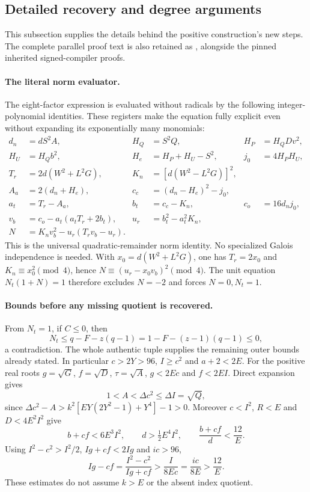 \subsection{Detailed recovery and degree arguments}
This subsection supplies the details behind the positive construction's
new steps. The complete parallel proof text is also retained as
, alongside the pinned inherited
signed-compiler proofs.

\paragraph{The literal norm evaluator.}
The eight-factor expression is evaluated without radicals by the following
integer-polynomial identities. These registers make the equation fully
explicit even without expanding its exponentially many monomials:
\begin{align*}
 d_n&=dS^2A,&H_Q&=S^2Q,&H_P&=H_QDv^2,\\
 H_U&=H_Qb^2,&H_e&=H_P+H_U-S^2,&j_0&=4H_PH_U,\\
 T_r&=2d(W^2+L^2G),&K_n&=[d(W^2-L^2G)]^2,&&\\
 A_a&=2(d_n+H_e),&c_c&=(d_n-H_e)^2-j_0,&&\\
 a_t&=T_r-A_a,&b_t&=c_c-K_n,&c_o&=16d_nj_0,\\
 v_b&=c_o-a_t(a_tT_r+2b_t),&u_r&=b_t^2-a_t^2K_n,&&\\
 N&=K_nv_b^2-u_r(T_rv_b-u_r).&&&&
\end{align*}
This is the universal quadratic-remainder norm identity. No specialized
Galois independence is needed. With $x_0=d(W^2+L^2G)$, one has
$T_r=2x_0$ and $K_n\equiv x_0^2\pmod4$, hence
$N\equiv(u_r-x_0v_b)^2\pmod4$. The unit equation
$N_t(1+N)=1$ therefore excludes $N=-2$ and forces $N=0,N_t=1$.

\paragraph{Bounds before any missing quotient is recovered.}
From $N_t=1$, if $C\le0$, then
\[
 N_t\le q-F-z(q-1)=1-F-(z-1)(q-1)\le0,
\]
a contradiction. The whole authentic tuple supplies the remaining outer
bounds already stated. In particular $c>2Y>96$, $I\ge c^2$ and $a+2<2E$.
For the positive real roots $g=\sqrt G$, $f=\sqrt D$, $\tau=\sqrt A$,
$g<2Ec$ and $f<2EI$. Direct expansion gives
\[
 1<A<\Delta c^2\le\Delta I=\sqrt Q,
\]
since $\Delta c^2-A>k^2[EY(2Y^2-1)+Y^4]-1>0$.
Moreover $c<I^2$, $R<E$ and $D<4E^2I^2$ give
\[
 b+cf<6E^3I^2,\qquad d>\tfrac12E^4I^2,\qquad
 \frac{b+cf}{d}<\frac{12}{E}.
\]
Using $I^2-c^2>I^2/2$, $Ig+cf<2Ig$ and $ic>96$,
\[
 Ig-cf=\frac{I^2-c^2}{Ig+cf}>\frac{I}{8Ec}
       =\frac{ic}{8E}>\frac{12}{E}.
\]
These estimates do not assume $k>E$ or the absent index quotient.

